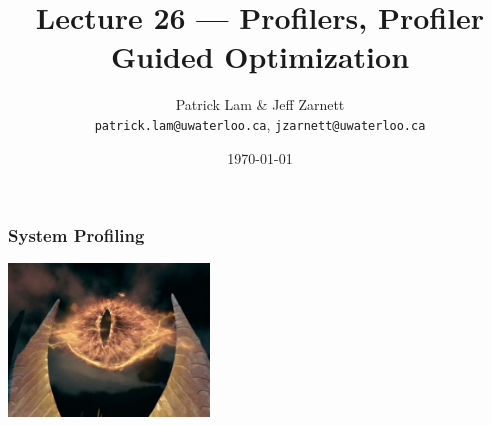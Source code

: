 

\title{Lecture 26 --- Profilers, Profiler Guided Optimization }

\author{Patrick Lam \& Jeff Zarnett \\ \small \texttt{patrick.lam@uwaterloo.ca}, \texttt{jzarnett@uwaterloo.ca}}
\date{\today}




\begin{frame}
  \titlepage

 \end{frame}
 
 
\begin{frame}
\frametitle{System Profiling}

\begin{center}
	\includegraphics[width=0.4\textwidth]{images/Eye_of_sauron.jpg}
\end{center}

\end{frame}







